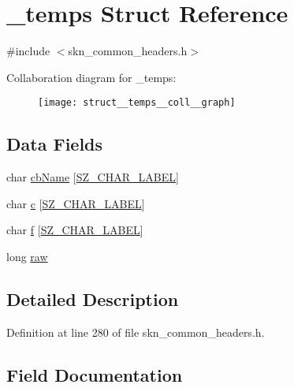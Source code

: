 \hypertarget{struct__temps}{}\section{\+\_\+temps Struct Reference}
\label{struct__temps}


{\ttfamily \#include $<$skn\+\_\+common\+\_\+headers.\+h$>$}



Collaboration diagram for \+\_\+temps\+:
\nopagebreak
\begin{figure}[H]
\begin{center}
\leavevmode
\texttt{[image: struct\_\_temps\_\_coll\_\_graph]}
\end{center}
\end{figure}
\subsection*{Data Fields}
\begin{DoxyCompactItemize}
\item 
char \hyperlink{struct__temps_a74414216b43459f4ebcada36b9b165f5}{cb\+Name} \mbox{[}\hyperlink{skn__common__headers_8h_a3122b900b1a34ceff868e0d51217e357}{S\+Z\+\_\+\+C\+H\+A\+R\+\_\+\+L\+A\+B\+E\+L}\mbox{]}
\item 
char \hyperlink{struct__temps_add683444c2985b00bd51bc69e9026a69}{c} \mbox{[}\hyperlink{skn__common__headers_8h_a3122b900b1a34ceff868e0d51217e357}{S\+Z\+\_\+\+C\+H\+A\+R\+\_\+\+L\+A\+B\+E\+L}\mbox{]}
\item 
char \hyperlink{struct__temps_a9de7d7f00c6df40b61735f25e3247b40}{f} \mbox{[}\hyperlink{skn__common__headers_8h_a3122b900b1a34ceff868e0d51217e357}{S\+Z\+\_\+\+C\+H\+A\+R\+\_\+\+L\+A\+B\+E\+L}\mbox{]}
\item 
long \hyperlink{struct__temps_a62d3522782b91f7fbb444bceb91c1876}{raw}
\end{DoxyCompactItemize}


\subsection{Detailed Description}


Definition at line 280 of file skn\+\_\+common\+\_\+headers.\+h.



\subsection{Field Documentation}
\hypertarget{struct__temps_add683444c2985b00bd51bc69e9026a69}{}
